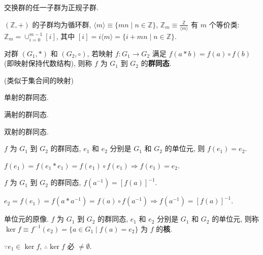 \documentclass{note}
\begin{document}
\begin{thm}
    交换群的任一子群为正规子群.
\end{thm}

\begin{eg}
    $(\mathbb{Z},+)$ 的子群均为循环群, $\langle m\rangle\equiv\{mn\mid n\in\mathbb{Z}\}$, $\mathbb{Z}_m\equiv\frac{\mathbb{Z}}{\langle m\rangle}$ 有 $m$ 个等价类: $\mathbb{Z}_m=\cup_{i=0}^{m-1}[i]$, 其中 $[i]=i\langle m\rangle=\{i+mn\mid n\in\mathbb{Z}\}$.
\end{eg}

\begin{df}[群同态]
    对群 $(G_1,*)$ 和 $(G_2,\circ)$, 若映射 $f:G_1\rightarrow G_2$ 满足 $f(a*b)=f(a)\circ f(b)$ (即映射保持代数结构), 则称 $f$ 为 $G_1$ 到 $G_2$ 的\textbf{群同态}.
\end{df}
(类似于集合间的映射)

\begin{df}[单同态]
    单射的群同态.
\end{df}

\begin{df}[满同态]
    满射的群同态.
\end{df}

\begin{df}[同构]
    双射的群同态.
\end{df}

\begin{thm}
    $f$ 为 $G_1$ 到 $G_2$ 的群同态, $e_1$ 和 $e_2$ 分别是 $G_1$ 和 $G_2$ 的单位元, 则 $f(e_1)=e_2$.
\end{thm}
\begin{pf}
    $f(e_1)=f(e_1*e_1)=f(e_1)\circ f(e_1)\Longrightarrow f(e_1)=e_2$.
\end{pf}

\begin{thm}
    $f$ 为 $G_1$ 到 $G_2$ 的群同态, $f(a^{-1})=[f(a)]^{-1}$.
\end{thm}
\begin{pf}
    $e_2=f(e_1)=f(a*a^{-1})=f(a)\circ f(a^{-1})\Longrightarrow f(a^{-1})=[f(a)]^{-1}$.
\end{pf}

\begin{df}
    单位元的原像. $f$ 为 $G_1$ 到 $G_2$ 的群同态, $e_1$ 和 $e_2$ 分别是 $G_1$ 和 $G_2$ 的单位元, 则称 $\ker f\equiv f^{-1}(e_2)=\{a\in G_1\mid f(a)=e_2\}$ 为 $f$ 的\textbf{核}.
\end{df}

$\because e_1\in\ker f$, $\therefore\ker f$ 必 $\neq\emptyset$.
\end{document}
